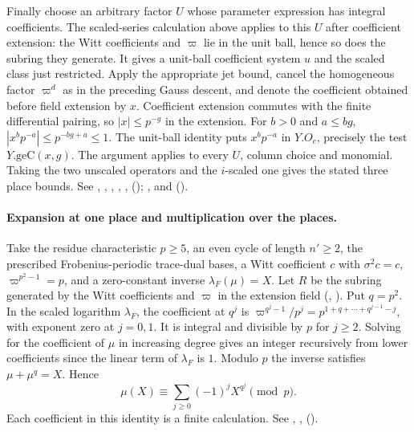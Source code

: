 Finally choose an arbitrary factor $U$ whose parameter expression has
integral coefficients. The scaled-series calculation above applies to
this $U$ after coefficient extension: the Witt coefficients and
$\varpi$ lie in the unit ball, hence so does the subring they generate.
It gives a unit-ball coefficient system $u$ and the scaled class just
restricted. Apply the appropriate jet bound, cancel the homogeneous
factor $\varpi^d$ as in the preceding Gauss descent, and denote the
coefficient obtained before field extension by $x$. Coefficient
extension commutes with the finite differential pairing, so
$|x|\le p^{-g}$ in the extension. For $b>0$ and $a\le bg$,
$|x^bp^{-a}|\le p^{-bg+a}\le1$. The unit-ball identity puts
$x^bp^{-a}$ in $Y.O_c$, precisely the test $Y.\mathrm{geC}(x,g)$.
The argument applies to every $U$, column choice and monomial. Taking
the two unscaled operators and the $i$-scaled one gives the stated
three place bounds. See , ,
, , , 
();
,  and
().

\paragraph{Expansion at one place and multiplication over the places.}
Take the residue characteristic $p\ge5$, an even cycle of length
$n'\ge2$, the prescribed Frobenius-periodic trace-dual bases, a Witt
coefficient $c$ with $\sigma^2c=c$, $\varpi^{p^2-1}=p$, and a
zero-constant inverse $\lambda_F(\mu)=X$. Let $R$ be the subring
generated by the Witt coefficients and $\varpi$ in the extension
field (, ). Put $q=p^2$. In the scaled logarithm
$\lambda_F$, the coefficient at $q^j$ is
$\varpi^{q^j-1}/p^j=p^{1+q+\cdots+q^{j-1}-j}$, with exponent zero
at $j=0,1$. It is integral and divisible by $p$ for $j\ge2$.
Solving for the coefficient of $\mu$ in increasing degree gives an
integer recursively from lower coefficients since the linear term of
$\lambda_F$ is $1$. Modulo $p$ the inverse satisfies $\mu+\mu^q=X$.
Hence
\[
               \mu(X)\equiv\sum_{j\ge0}(-1)^jX^{q^j}\pmod p .
\]
Each coefficient in this identity is a finite calculation. See
, , 
().

